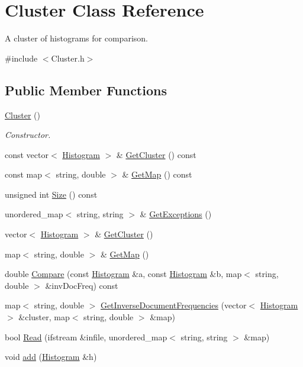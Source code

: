 \hypertarget{class_cluster}{}\section{Cluster Class Reference}
\label{class_cluster}


A cluster of histograms for comparison.  




{\ttfamily \#include $<$Cluster.\+h$>$}

\subsection*{Public Member Functions}
\begin{DoxyCompactItemize}
\item 
\hyperlink{class_cluster_aee7feb1d599d4c8fda6c3ee83e86ba81}{Cluster} ()
\begin{DoxyCompactList}\small\item\em Constructor. \end{DoxyCompactList}\item 
const vector$<$ \hyperlink{class_histogram}{Histogram} $>$ \& \hyperlink{class_cluster_aa890420aa5906859751f7920dc5b30d0}{Get\+Cluster} () const
\item 
const map$<$ string, double $>$ \& \hyperlink{class_cluster_a4e3685824bdd4b01763f8e811000f275}{Get\+Map} () const
\item 
unsigned int \hyperlink{class_cluster_a916e731be9d3e52a404152e94b8b127d}{Size} () const
\item 
unordered\+\_\+map$<$ string, string $>$ \& \hyperlink{class_cluster_ae703b09c81c25ab89bde18ca09aa1a5d}{Get\+Exceptions} ()
\item 
vector$<$ \hyperlink{class_histogram}{Histogram} $>$ \& \hyperlink{class_cluster_a9c667ad971afdc00ffd2cb83611dabde}{Get\+Cluster} ()
\item 
map$<$ string, double $>$ \& \hyperlink{class_cluster_a7c98f2cdd78a833e9033f8a9a5a5a7b0}{Get\+Map} ()
\item 
double \hyperlink{class_cluster_ad4f8765aefafc838c95a9c2334ee0356}{Compare} (const \hyperlink{class_histogram}{Histogram} \&a, const \hyperlink{class_histogram}{Histogram} \&b, map$<$ string, double $>$ \&inv\+Doc\+Freq) const
\item 
map$<$ string, double $>$ \hyperlink{class_cluster_ada4f897af1294c97e3ff2f8023a92b55}{Get\+Inverse\+Document\+Frequencies} (vector$<$ \hyperlink{class_histogram}{Histogram} $>$ \&cluster, map$<$ string, double $>$ \&map)
\item 
bool \hyperlink{class_cluster_ad9132f66736e8f170eb7746f9cd482d0}{Read} (ifstream \&infile, unordered\+\_\+map$<$ string, string $>$ \&map)
\item 
void \hyperlink{class_cluster_a410aab730d5fdf04b4ee8f230d0149e2}{add} (\hyperlink{class_histogram}{Histogram} \&h)
\end{DoxyCompactItemize}
